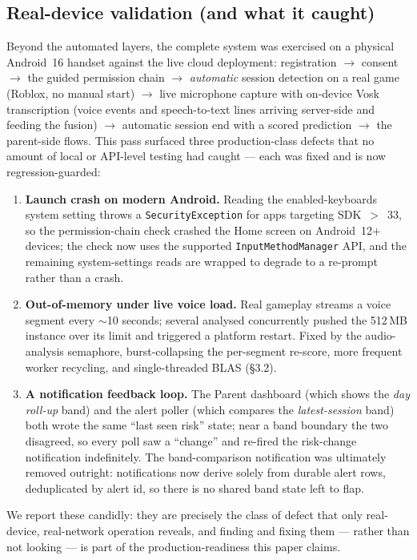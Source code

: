 \documentclass[11pt,a4paper]{article}
\begin{document}
\subsection{Real-device validation (and what it caught)}
Beyond the automated layers, the complete system was exercised on a physical Android~16
handset against the live cloud deployment: registration $\rightarrow$ consent
$\rightarrow$ the guided permission chain $\rightarrow$ \emph{automatic} session
detection on a real game (Roblox, no manual start) $\rightarrow$ live microphone
capture with on-device Vosk transcription (voice events and speech-to-text lines
arriving server-side and feeding the fusion) $\rightarrow$ automatic session end with a
scored prediction $\rightarrow$ the parent-side flows. This pass surfaced three
production-class defects that no amount of local or API-level testing had caught ---
each was fixed and is now regression-guarded:
\begin{enumerate}[leftmargin=1.4em]
  \item \textbf{Launch crash on modern Android.} Reading the enabled-keyboards system
        setting throws a \texttt{SecurityException} for apps targeting SDK~$>$~33, so
        the permission-chain check crashed the Home screen on Android~12+ devices; the
        check now uses the supported \texttt{InputMethodManager} API, and the
        remaining system-settings reads are wrapped to degrade to a re-prompt rather
        than a crash.
  \item \textbf{Out-of-memory under live voice load.} Real gameplay streams a voice
        segment every $\sim$10 seconds; several analysed concurrently pushed the
        512\,MB instance over its limit and triggered a platform restart. Fixed by the
        audio-analysis semaphore, burst-collapsing the per-segment re-score, more
        frequent worker recycling, and single-threaded BLAS (\S3.2).
  \item \textbf{A notification feedback loop.} The Parent dashboard (which shows the
        \emph{day roll-up} band) and the alert poller (which compares the
        \emph{latest-session} band) both wrote the same ``last seen risk'' state; near
        a band boundary the two disagreed, so every poll saw a ``change'' and re-fired
        the risk-change notification indefinitely. The band-comparison notification
        was ultimately removed outright: notifications now derive solely from durable
        alert rows, deduplicated by alert id, so there is no shared band state left
        to flap.
\end{enumerate}
We report these candidly: they are precisely the class of defect that only
real-device, real-network operation reveals, and finding and fixing them --- rather
than not looking --- is part of the production-readiness this paper claims.
\end{document}
